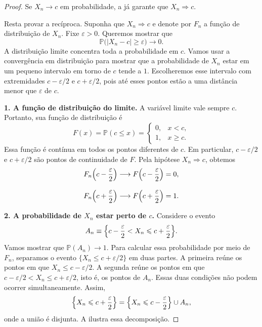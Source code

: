 \documentclass[12pt,portuguese]{article}
\theoremstyle{definition}
\theoremstyle{plainexercise}
\theoremstyle{starredexercise}
\theoremstyle{definition}
\begin{document}
\begin{proof}
Se $X_n\to c$ em probabilidade, a  já garante
que $X_n\Rightarrow c$.

Resta provar a recíproca. Suponha que $X_n\Rightarrow c$ e denote por $F_n$
a função de distribuição de $X_n$. Fixe $\varepsilon>0$. Queremos mostrar
que
\[
\mathbb{P}\bigl(|X_n-c|\geqslant\varepsilon\bigr)\longrightarrow0.
\]
A distribuição limite concentra toda a probabilidade em $c$. Vamos usar a
convergência em distribuição para mostrar que a probabilidade de $X_n$ estar
em um pequeno intervalo em torno de $c$ tende a $1$. Escolheremos esse
intervalo com extremidades $c-\varepsilon/2$ e $c+\varepsilon/2$, pois até
esses pontos estão a uma distância menor que $\varepsilon$ de $c$.

\smallskip
\noindent\textbf{1. A função de distribuição do limite.}
A variável limite vale sempre $c$. Portanto, sua função de distribuição é
\[
F(x)=\mathbb{P}(c\leqslant x)=
\begin{cases}
0, & x<c,\\
1, & x\geqslant c.
\end{cases}
\]
Essa função é contínua em todos os pontos diferentes de $c$.
Em particular, $c-\varepsilon/2$ e $c+\varepsilon/2$ são pontos de
continuidade de $F$. Pela hipótese $X_n\Rightarrow c$, obtemos
\begin{align*}
F_n\Bigl(c-\frac{\varepsilon}{2}\Bigr)
&\longrightarrow F\Bigl(c-\frac{\varepsilon}{2}\Bigr)=0,
\\[0.3cm]
F_n\Bigl(c+\frac{\varepsilon}{2}\Bigr)
&\longrightarrow F\Bigl(c+\frac{\varepsilon}{2}\Bigr)=1.
\end{align*}

\smallskip
\noindent\textbf{2. A probabilidade de $X_n$ estar perto de $c$.}
Considere o evento
\[
A_n\equiv
\Bigl\{c-\frac{\varepsilon}{2}<X_n\leqslant c+\frac{\varepsilon}{2}\Bigr\}.
\]
Vamos mostrar que $\mathbb{P}(A_n)\to1$. Para calcular essa probabilidade por
meio de $F_n$, separamos o evento $\{X_n\leqslant c+\varepsilon/2\}$ em duas
partes. A primeira reúne os pontos em que $X_n\leqslant c-\varepsilon/2$.
A segunda reúne os pontos em que
$c-\varepsilon/2<X_n\leqslant c+\varepsilon/2$, isto é, os pontos de $A_n$.
Essas duas condições não podem ocorrer simultaneamente. Assim,
\[
\Bigl\{X_n\leqslant c+\frac{\varepsilon}{2}\Bigr\}
=
\Bigl\{X_n\leqslant c-\frac{\varepsilon}{2}\Bigr\}\cup A_n,
\]
onde a união é disjunta. A  ilustra essa
decomposição.


\end{proof}
\end{document}
